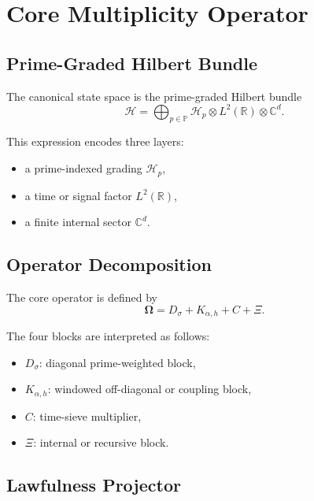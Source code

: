 \documentclass[11pt]{article}
\theoremstyle{plain}
\theoremstyle{definition}
\theoremstyle{remark}
\newcommand{\Hbundle}{\mathcal{H}}
\newcommand{\Pset}{\mathbb{P}}
\newcommand{\R}{\mathbb{R}}
\newcommand{\C}{\mathbb{C}}
\newcommand{\Om}{\boldsymbol{\Omega}}
\begin{document}
\section{Core Multiplicity Operator}

\subsection{Prime-Graded Hilbert Bundle}

The canonical state space is the prime-graded Hilbert bundle
\begin{equation}
\Hbundle
=
\bigoplus_{p \in \Pset}
\mathcal{H}_p \otimes L^2(\R) \otimes \C^d.
\label{eq:hilbert-bundle}
\end{equation}

This expression encodes three layers:
\begin{itemize}
    \item a prime-indexed grading \(\mathcal{H}_p\),
    \item a time or signal factor \(L^2(\R)\),
    \item a finite internal sector \(\C^d\).
\end{itemize}

\subsection{Operator Decomposition}

The core operator is defined by
\begin{equation}
\Om = D_\sigma + K_{\alpha,h} + C + \Xi.
\label{eq:omega-decomposition}
\end{equation}

The four blocks are interpreted as follows:
\begin{itemize}
    \item \(D_\sigma\): diagonal prime-weighted block,
    \item \(K_{\alpha,h}\): windowed off-diagonal or coupling block,
    \item \(C\): time-sieve multiplier,
    \item \(\Xi\): internal or recursive block.
\end{itemize}

\subsection{Lawfulness Projector}
\end{document}
